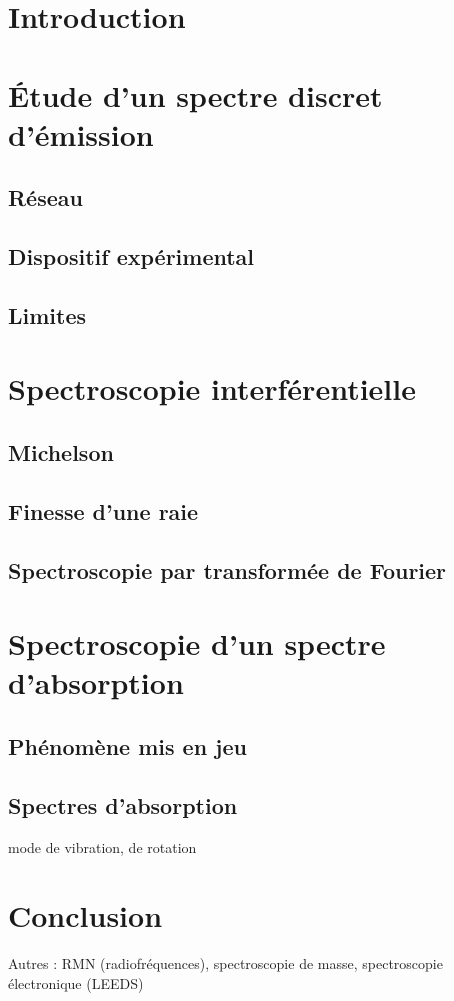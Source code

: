 


\biblio{}

\section*{Introduction}
\section{Étude d'un spectre discret d'émission}
\subsection{Réseau}
\subsection{Dispositif expérimental}
\subsection{Limites}
\section{Spectroscopie interférentielle}
\subsection{Michelson}
\subsection{Finesse d'une raie}
\subsection{Spectroscopie par transformée de Fourier}

\section{Spectroscopie d'un spectre d'absorption}
\subsection{Phénomène mis en jeu}
\subsection{Spectres d'absorption}
mode de vibration, de rotation
\section*{Conclusion}

Autres : RMN (radiofréquences), spectroscopie de masse, spectroscopie électronique (LEEDS)

